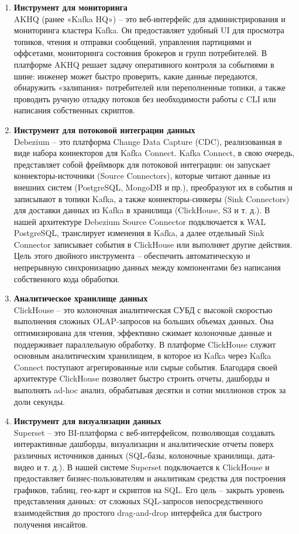 \begin{enumerate}[1.]
	\item \textbf{Инструмент для мониторинга}\\
	      AKHQ (ранее «Kafka HQ») \cite{kafka} – это веб-интерфейс для администрирования и мониторинга кластера Kafka. Он предоставляет удобный UI для просмотра топиков, чтения и отправки сообщений, управления партициями и оффсетами, мониторинга состояния брокеров и групп потребителей. В платформе AKHQ решает задачу оперативного контроля за событиями в шине: инженер может быстро проверить, какие данные передаются, обнаружить «залипания» потребителей или переполненные топики, а также проводить ручную отладку потоков без необходимости работы с CLI или написания собственных скриптов.
	\item \textbf{Инструмент для потоковой интеграции данных}\\
	      Debezium\cite{debezium} – это платформа Change Data Capture (CDC)\cite{cdc}, реализованная в виде набора коннекторов для Kafka Connect\cite{kafka_connect}. Kafka Connect, в свою очередь, представляет собой фреймворк для потоковой интеграции: он запускает коннекторы-источники (Source Connectors), которые читают данные из внешних систем (PostgreSQL, MongoDB и пр.), преобразуют их в события и записывают в топики Kafka, а также коннекторы-синкеры (Sink Connectors) для доставки данных из Kafka в хранилища (ClickHouse, S3 и т. д.). В нашей архитектуре Debezium Source Connector подключается к WAL PostgreSQL, транслирует изменения в Kafka, а далее отдельный Sink Connector записывает события в ClickHouse или выполняет другие действия. Цель этого двойного инструмента – обеспечить автоматическую и непрерывную синхронизацию данных между компонентами без написания собственного кода обработки.
	\item \textbf{Аналитическое хранилище данных}\\
	      ClickHouse\cite{clickhouse} – это колоночная аналитическая СУБД с высокой скоростью выполнения сложных OLAP-запросов\cite{olap} на больших объемах данных. Она оптимизирована для чтения, эффективно сжимает колоночные данные и поддерживает параллельную обработку. В платформе ClickHouse служит основным аналитическим хранилищем, в которое из Kafka через Kafka Connect поступают агрегированные или сырые события. Благодаря своей архитектуре ClickHouse позволяет быстро строить отчеты, дашборды и выполнять ad-hoc анализ, обрабатывая десятки и сотни миллионов строк за доли секунды.
	\item \textbf{Инструмент для визуализации данных}\\
	      Superset\cite{superset} – это BI-платформа с веб-интерфейсом, позволяющая создавать интерактивные дашборды, визуализации и аналитические отчеты поверх различных источников данных (SQL-базы, колоночные хранилища, дата-видео и т. д.). В нашей системе Superset подключается к ClickHouse и предоставляет бизнес-пользователям и аналитикам средства для построения графиков, таблиц, гео-карт и скриптов на SQL. Его цель – закрыть уровень представления данных: от сложных SQL-запросов непосредственного взаимодействия до простого drag-and-drop интерфейса для быстрого получения инсайтов.
\end{enumerate}


